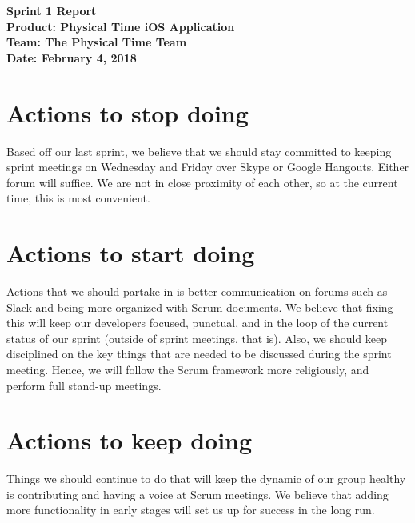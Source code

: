 \documentclass[11pt]{article}
\newcommand\tab[1][1cm]{\hspace*{#1}}
\begin{document}
	\Large{\textbf{Sprint 1 Report}}\\
	\Large{\textbf{Product: Physical Time iOS Application}}\\
	\Large{\textbf{Team: The Physical Time Team}}\\
	\Large{\textbf{Date: February 4, 2018}}\\

	\vspace{-3mm}

	\section{Actions to stop doing}
		\vspace{-3mm}
		\tab \normalsize{Based off our last sprint, we believe that we should stay committed to keeping sprint meetings on Wednesday and Friday over Skype or Google Hangouts. Either forum will suffice. We are not in close proximity of each other, so at the current time, this is most convenient.}

	\section{Actions to start doing}
		\vspace{-3mm}
		\tab \normalsize{Actions that we should partake in is better communication on forums such as Slack and being more organized with Scrum documents. We believe that fixing this will keep our developers focused, punctual, and in the loop of the current status of our sprint (outside of sprint meetings, that is). Also, we should keep disciplined on the key things that are needed to be discussed during the sprint meeting. Hence, we will follow the Scrum framework more religiously, and perform full stand-up meetings.}

	\section{Actions to keep doing}
		\vspace{-3mm}
		\tab \normalsize{Things we should continue to do that will keep the dynamic of our group healthy is contributing and having a voice at Scrum meetings. We believe that adding more functionality in early stages will set us up for success in the long run.}
\end{document}
